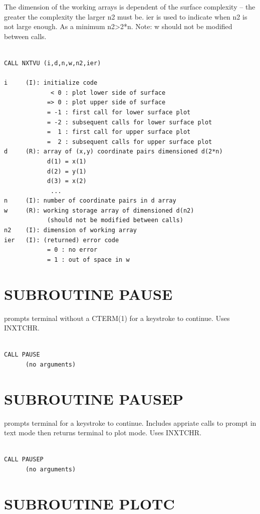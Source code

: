 \documentclass[11pt]{report}
\begin{document}
The dimension of the working arrays is dependent of the surface
complexity -- the greater the complexity the larger n2 must be.  ier is
used to indicate when n2 is not large enough.  As a minimum n2>2*n.
Note: w should not be modified between calls.
\begin{verbatim}

CALL NXTVU (i,d,n,w,n2,ier)

i     (I): initialize code
             < 0 : plot lower side of surface
            => 0 : plot upper side of surface
            = -1 : first call for lower surface plot
            = -2 : subsequent calls for lower surface plot
            =  1 : first call for upper surface plot
            =  2 : subsequent calls for upper surface plot
d     (R): array of (x,y) coordinate pairs dimensioned d(2*n)
            d(1) = x(1)
            d(2) = y(1)
            d(3) = x(2)
             ...
n     (I): number of coordinate pairs in d array
w     (R): working storage array of dimensioned d(n2)
            (should not be modified between calls)
n2    (I): dimension of working array
ier   (I): (returned) error code
            = 0 : no error
            = 1 : out of space in w
\end{verbatim}

\section{SUBROUTINE PAUSE}

 prompts terminal without a CTERM(1) for a keystroke to continue.
Uses INXTCHR.
\begin{verbatim}

CALL PAUSE
      (no arguments)
\end{verbatim}

\section{SUBROUTINE PAUSEP}

 prompts terminal for a keystroke to continue.  Includes appriate
 calls to prompt in text mode then returns terminal to plot mode.
Uses INXTCHR.
\begin{verbatim}

CALL PAUSEP
      (no arguments)
\end{verbatim}

\section{SUBROUTINE PLOTC}
\end{document}
